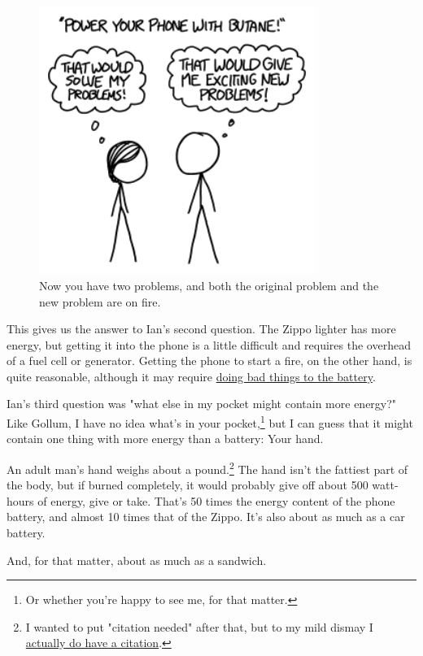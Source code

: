 {\begin{figure}[!htbp]
\centering
\includegraphics[scale=0.5, max width=0.8\textwidth]{imgs/a/128/knock.png}
\caption{Now you have two problems, and both the original problem and the new problem are on fire.}
\end{figure}

{This gives us the answer to Ian's second question. The Zippo lighter has more energy, but getting it into the phone is a little difficult and requires the overhead of a fuel cell or generator. Getting the phone to start a fire, on the other hand, is quite reasonable, although it may require \href{https://www.youtube.com/watch?v=SMy2\_qNO2Y0}{doing bad things to the battery}.}

{Ian's third question was "what else in my pocket might contain more energy?" Like Gollum, I have no idea what's in your pocket,{\footnote{Or whether you're happy to see me, for that matter.} } but I can guess that it might contain one thing with more energy than a battery: Your hand.}

{An adult man's hand weighs about a pound.{\footnote{I wanted to put "citation needed" after that, but to my mild dismay I \href{http://www.exrx.net/Kinesiology/Segments.html}{actually do have a citation}.} } The hand isn't the fattiest part of the body, but if burned completely, it would probably give off about 500 watt-hours of energy, give or take. That's 50 times the energy content of the phone battery, and almost 10 times that of the Zippo. It's also about as much as a car battery.}

{And, for that matter, about as much as a sandwich.}

}

